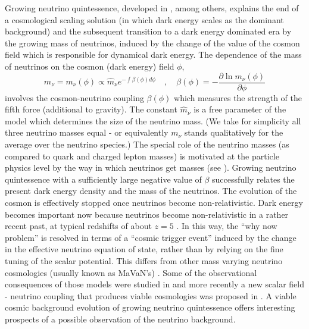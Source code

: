 Growing neutrino quintessence, developed in \cite{amendola_growing_2008,wetterich_growing_2007}, among others,
explains the end of a cosmological scaling solution (in which dark
energy scales as the dominant background) and the subsequent transition
to a dark energy dominated era by the growing mass of neutrinos, induced
by the change of the value of the cosmon field which is responsible
for dynamical dark energy. The dependence of the mass of neutrinos
on the cosmon (dark energy) field $\phi$, 
\begin{equation}
m_{\nu}=m_{\nu}(\phi)\propto\hat{m}_{\nu}e^{-\int\beta(\phi)d\phi}\quad,\quad \beta(\phi)=-\frac{\partial\ln m_{\nu}(\phi)}{\partial\phi}\label{eq: mass_def}
\end{equation}
involves the cosmon-neutrino coupling $\beta(\phi)$ which measures
the strength of the fifth force (additional to gravity). The constant
$\hat{m}_{\nu}$ is a free parameter of the model which determines
the size of the neutrino mass. (We take for simplicity all three neutrino
masses equal - or equivalently $m_{\nu}$ stands qualitatively for
the average over the neutrino species.) The special role of the neutrino
masses (as compared to quark and charged lepton masses) is motivated
at the particle physics level by the way in which neutrinos get masses
(see \cite{wetterich_growing_2007}). Growing neutrino quintessence with
a sufficiently large negative value of $\beta$ successfully relates
the present dark energy density and the mass of the neutrinos. The
evolution of the cosmon is effectively stopped once neutrinos become
non-relativistic. Dark energy becomes important now because neutrinos
become non-relativistic in a rather recent past, at typical redshifts
of about $z=5$ \cite{mota_neutrino_2008}. In this way, the ``why
now problem'' is resolved in terms of a ``cosmic trigger event''
induced by the change in the effective neutrino equation of state,
rather than by relying on the fine tuning of the scalar potential.
This differs from other mass varying neutrino cosmologies (usually
known as MaVaN's) \cite{brookfield_cosmology_2007,la_vacca_mass-varying_2013,bi_cosmological_2005,fardon_dark_2004,kaplan_neutrino_2004,spitzer_stability_2006,takahashi_speed_2006}.
Some of the observational consequences of those models were studied
in \cite{la_vacca_mass-varying_2013,kaplan_neutrino_2004} and more
recently a new scalar field - neutrino coupling that produces viable
cosmologies was proposed in \cite{simpson_dark_2016}. A viable cosmic
background evolution of growing neutrino quintessence offers interesting
prospects of a possible observation of the neutrino background.

